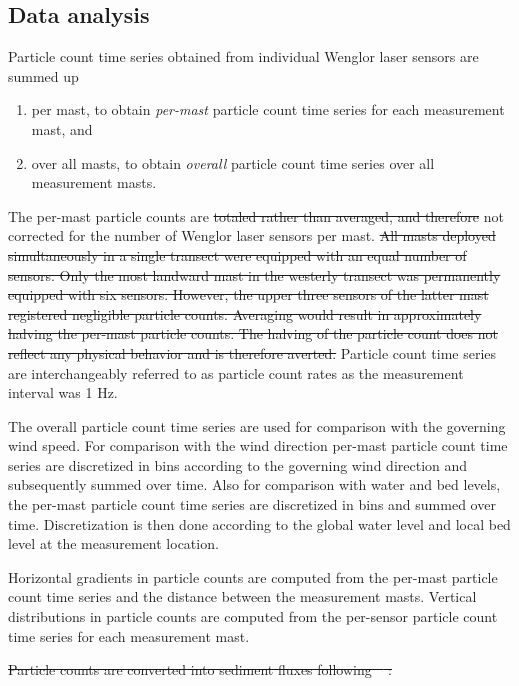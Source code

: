 \documentclass[preprint,12pt,authoryear,a4paper]{elsarticle}
\providecommand{\DIFdel}[1]{{\protect\color{red}\sout{#1}}}                      %
\providecommand{\DIFdelbegin}{} %
\providecommand{\DIFdelend}{} %
\begin{document}
\subsection{Data analysis}

Particle count time series obtained from individual Wenglor laser
sensors are summed up
\begin{enumerate}
\item per mast, to obtain \emph{per-mast} particle count time series
  for each measurement mast, and
\item over all masts, to obtain \emph{overall} particle count time
  series over all measurement masts.
\end{enumerate}
The per-mast particle counts are \DIFdelbegin \DIFdel{totaled rather than averaged, and
therefore }\DIFdelend not corrected for the number of
Wenglor laser sensors per mast. \DIFdelbegin \DIFdel{All masts deployed simultaneously in a single transect were
equipped with an equal number of sensors. Only the most landward mast
in the westerly transect was permanently equipped with six
sensors. However, the upper three sensors of the latter mast
registered negligible particle counts. Averaging would result in
approximately halving the per-mast particle counts. The halving of the
particle count does not reflect any physical behavior and is therefore
averted. }\DIFdelend Particle count time series are
interchangeably referred to as particle count rates as the measurement
interval was 1 Hz.

The overall particle count time series are used for comparison with
the governing wind speed. For comparison with the wind direction
per-mast particle count time series are discretized in bins according
to the governing wind direction and subsequently summed over
time. Also for comparison with water and bed levels, the per-mast
particle count time series are discretized in bins and summed over
time. Discretization is then done according to the global water level
and local bed level at the measurement location.

Horizontal gradients in particle counts are computed from the per-mast
particle count time series and the distance between the measurement
masts. Vertical distributions in particle counts are computed from the
per-sensor particle count time series for each measurement mast.

\DIFdelbegin \DIFdel{Particle counts are converted into sediment fluxes following
\mbox{%
\citet{Barchyn2014}}%
:
}%
\end{document}
